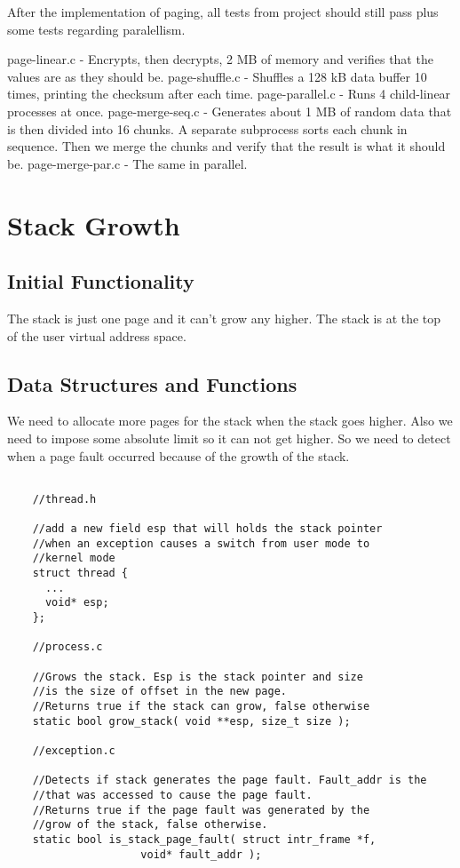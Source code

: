 After the implementation of paging, all tests from project should still pass plus some tests regarding paralellism.

page-linear.c - Encrypts, then decrypts, 2 MB of memory and verifies that the values are as they should be.
page-shuffle.c - Shuffles a 128 kB data buffer 10 times, printing the checksum after each time.
page-parallel.c - Runs 4 child-linear processes at once.
page-merge-seq.c - Generates about 1 MB of random data that is then divided into 16 chunks.  A separate subprocess sorts each chunk in sequence.  Then we merge the chunks and verify that the result is what it should be.
page-merge-par.c - The same in parallel.

\section{Stack Growth}
\subsection{Initial Functionality}

The stack is just one page and it can't grow any higher. The stack is at the top of the user
virtual address space.

\subsection{Data Structures and Functions}

We need to allocate more pages for the stack when the stack goes higher. Also we need to
impose some absolute limit so it can not get higher. So we need to detect when a page fault occurred because of the growth of the stack. 

\begin{lstlisting} 

	//thread.h

	//add a new field esp that will holds the stack pointer
	//when an exception causes a switch from user mode to
	//kernel mode
	struct thread {
	  ...
	  void* esp;
	};

	//process.c

	//Grows the stack. Esp is the stack pointer and size
	//is the size of offset in the new page.
	//Returns true if the stack can grow, false otherwise
	static bool grow_stack( void **esp, size_t size );

	//exception.c

	//Detects if stack generates the page fault. Fault_addr is the 
	//that was accessed to cause the page fault.
	//Returns true if the page fault was generated by the
	//grow of the stack, false otherwise.
	static bool is_stack_page_fault( struct intr_frame *f, 
					 void* fault_addr ); 
	
\end{lstlisting}


